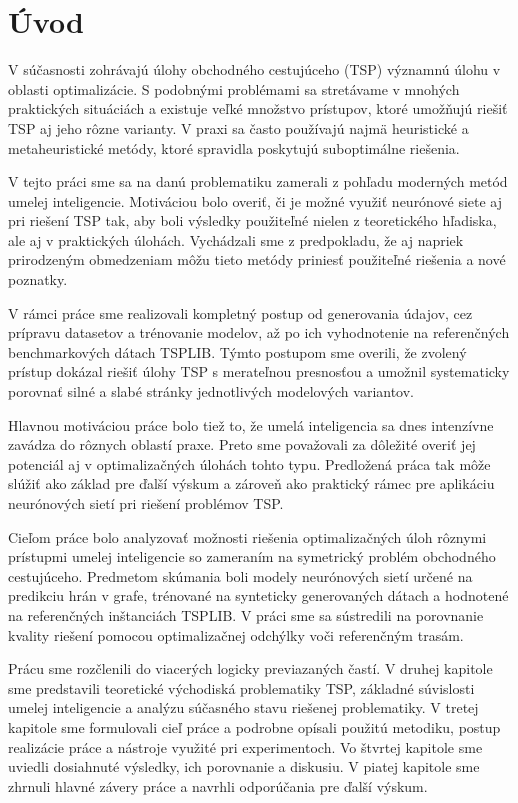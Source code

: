 ﻿\chapter{Úvod}

\indent V súčasnosti zohrávajú úlohy obchodného cestujúceho (TSP) významnú úlohu v oblasti optimalizácie. S podobnými problémami sa stretávame v mnohých praktických situáciách a existuje veľké množstvo prístupov, ktoré umožňujú riešiť TSP aj jeho rôzne varianty. V praxi sa často používajú najmä heuristické a metaheuristické metódy, ktoré spravidla poskytujú suboptimálne riešenia.

V tejto práci sme sa na danú problematiku zamerali z pohľadu moderných metód umelej inteligencie. Motiváciou bolo overiť, či je možné využiť neurónové siete aj pri riešení TSP tak, aby boli výsledky použiteľné nielen z teoretického hľadiska, ale aj v praktických úlohách. Vychádzali sme z predpokladu, že aj napriek prirodzeným obmedzeniam môžu tieto metódy priniesť použiteľné riešenia a nové poznatky.

V rámci práce sme realizovali kompletný postup od generovania údajov, cez prípravu datasetov a trénovanie modelov, až po ich vyhodnotenie na referenčných benchmarkových dátach TSPLIB. Týmto postupom sme overili, že zvolený prístup dokázal riešiť úlohy TSP s merateľnou presnosťou a umožnil systematicky porovnať silné a slabé stránky jednotlivých modelových variantov.

Hlavnou motiváciou práce bolo tiež to, že umelá inteligencia sa dnes intenzívne zavádza do rôznych oblastí praxe. Preto sme považovali za dôležité overiť jej potenciál aj v optimalizačných úlohách tohto typu. Predložená práca tak môže slúžiť ako základ pre ďalší výskum a zároveň ako praktický rámec pre aplikáciu neurónových sietí pri riešení problémov TSP.

Cieľom práce bolo analyzovať možnosti riešenia optimalizačných úloh rôznymi prístupmi umelej inteligencie so zameraním na symetrický problém obchodného cestujúceho. Predmetom skúmania boli modely neurónových sietí určené na predikciu hrán v grafe, trénované na synteticky generovaných dátach a hodnotené na referenčných inštanciách TSPLIB. V práci sme sa sústredili na porovnanie kvality riešení pomocou optimalizačnej odchýlky voči referenčným trasám.

Prácu sme rozčlenili do viacerých logicky previazaných častí. V druhej kapitole sme predstavili teoretické východiská problematiky TSP, základné súvislosti umelej inteligencie a analýzu súčasného stavu riešenej problematiky. V tretej kapitole sme formulovali cieľ práce a podrobne opísali použitú metodiku, postup realizácie práce a nástroje využité pri experimentoch. Vo štvrtej kapitole sme uviedli dosiahnuté výsledky, ich porovnanie a diskusiu. V piatej kapitole sme zhrnuli hlavné závery práce a navrhli odporúčania pre ďalší výskum.
